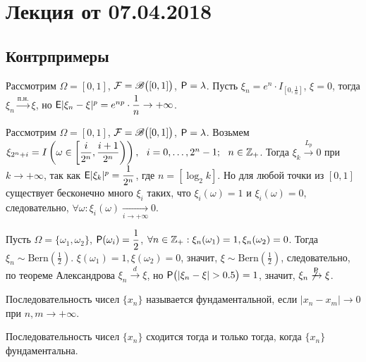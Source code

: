 \section{Лекция от 07.04.2018}
\subsection{Контрпримеры}
\begin{example}
	Рассмотрим $\Omega = [0, 1]$, $\F = \B\big([0,1] \big)$, $\P = \lambda$. Пусть $\xi_n = e^n \cdot I_{\left[0, \frac{1}{n} \right]}$, $\xi = 0$, тогда $\xi_n \xrightarrow{\text{п.н.}} \xi$, но $\E | \xi_n - \xi |^p = e^{np} \cdot \dfrac{1}{n} \rightarrow + \infty$.
\end{example}
\begin{example}
	Рассмотрим $\Omega = [0, 1]$, $\F = \B\big([0,1] \big)$, $\P = \lambda$. Возьмем $\xi_{2^n + i} = I \left( \omega \in \left[ \dfrac{i}{2^n}, \dfrac{i + 1}{2^n} \right) \right), ~~i = 0,\ldots, 2^n - 1;~~n \in \Z_+$. Тогда $\xi_k \xrightarrow{L_p} 0$ при $k \rightarrow + \infty$, так как $\E | \xi_k |^p = \dfrac{1}{2^n}$, где $n = \left[ \log_2 k \right]$. Но для любой точки из $[0,1]$ существует бесконечно много $\xi_i$ таких, что $\xi_i(\omega) = 1$ и $\xi_i(\omega) = 0$, следовательно, $\forall \omega: \xi_i(\omega) \xrightarrow[i \rightarrow + \infty ]{} 0$.
\end{example}
\begin{example} 
	Пусть $\Omega = \{ \omega_1, \omega_2 \}$, $\P(\omega_i) = \dfrac{1}{2}$, $\forall n \in \Z_+: \xi_n(\omega_1) = 1, \xi_n(\omega_2) = 0$. Тогда $\xi_n \sim \text{Bern} \left( \frac{1}{2} \right)$. $\xi(\omega_1) = 1, \xi(\omega_2) = 0$, значит, $\xi \sim \text{Bern} \left( \frac{1}{2} \right)$, следовательно, по теореме Александрова $\xi_n \xrightarrow{d} \xi$, но $\P \big( | \xi_n - \xi| > 0.5 \big) = 1$, значит, $\xi_n \not\xrightarrow{\P} \xi$. 
\end{example}
\begin{definition}
	Последовательность чисел $\{ x_n \}$ называется фундаментальной, если $|x_n - x_m| \rightarrow 0$ при $n, m \rightarrow +\infty$.
\end{definition}
\begin{theorem}
	Последовательность чисел $\{ x_n \}$ сходится тогда и только тогда, когда $\{ x_n \}$ фундаментальна.
\end{theorem}
